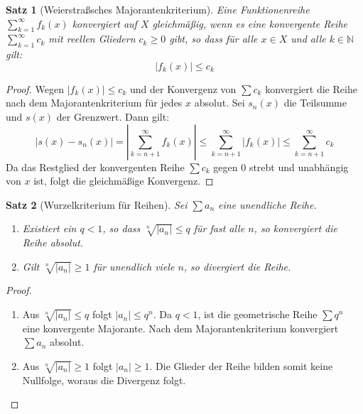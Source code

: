 \documentclass{article}
\newtheorem{satz}{Satz}[section]
\theoremstyle{definition}
\begin{document}
\begin{satz}[Weierstraßsches Majorantenkriterium]
Eine Funktionenreihe $\sum_{k=1}^\infty f_k(x)$ konvergiert auf $X$ gleichmäßig, wenn es eine konvergente Reihe $\sum_{k=1}^\infty c_k$ mit reellen Gliedern $c_k \ge 0$ gibt, so dass für alle $x \in X$ und alle $k \in \mathbb{N}$ gilt:
$$|f_k(x)| \le c_k$$


\end{satz}
\begin{proof}
Wegen $|f_k(x)| \le c_k$ und der Konvergenz von $\sum c_k$ konvergiert die Reihe nach dem Majorantenkriterium für jedes $x$ absolut. Sei $s_n(x)$ die Teilsumme und $s(x)$ der Grenzwert. Dann gilt:
$$|s(x) - s_n(x)| = |\sum_{k=n+1}^\infty f_k(x)| \le \sum_{k=n+1}^\infty |f_k(x)| \le \sum_{k=n+1}^\infty c_k$$
Da das Restglied der konvergenten Reihe $\sum c_k$ gegen 0 strebt und unabhängig von $x$ ist, folgt die gleichmäßige Konvergenz.
\end{proof}
\begin{satz}[Wurzelkriterium für Reihen]
Sei $\sum a_n$ eine unendliche Reihe.
\begin{enumerate}[label=\arabic*.]
    \item Existiert ein $q < 1$, so dass $\sqrt[n]{|a_n|} \le q$ für fast alle $n$, so konvergiert die Reihe absolut.
    \item Gilt $\sqrt[n]{|a_n|} \ge 1$ für unendlich viele $n$, so divergiert die Reihe.
\end{enumerate}


\end{satz}
\begin{proof}
\begin{enumerate}[label=\arabic*.]
    \item Aus $\sqrt[n]{|a_n|} \le q$ folgt $|a_n| \le q^n$. Da $q < 1$, ist die geometrische Reihe $\sum q^n$ eine konvergente Majorante. Nach dem Majorantenkriterium konvergiert $\sum a_n$ absolut.
    \item Aus $\sqrt[n]{|a_n|} \ge 1$ folgt $|a_n| \ge 1$. Die Glieder der Reihe bilden somit keine Nullfolge, woraus die Divergenz folgt.
\end{enumerate}
\end{proof}
\end{document}
